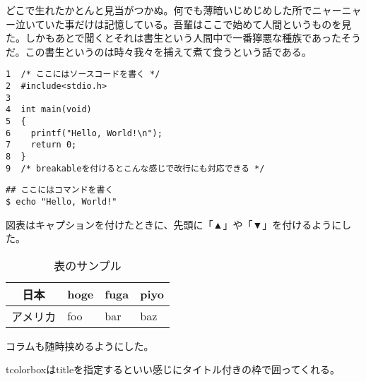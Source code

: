 \documentclass[11pt,dvipdfmx,b5paper,oneside]{jsbook}
\begin{document}
どこで生れたかとんと見当がつかぬ。何でも薄暗いじめじめした所でニャーニャー泣いていた事だけは記憶している。吾輩はここで始めて人間というものを見た。しかもあとで聞くとそれは書生という人間中で一番獰悪な種族であったそうだ。この書生というのは時々我々を捕えて煮て食うという話である。

\begin{tcolorbox}[breakable]
\begin{verbatim}
1  /* ここにはソースコードを書く */
2  #include<stdio.h>
3
4  int main(void)
5  {
6    printf("Hello, World!\n");
7    return 0;
8  }
9  /* breakableを付けるとこんな感じで改行にも対応できる */
\end{verbatim}
\end{tcolorbox}

\begin{shaded}
\begin{verbatim}
## ここにはコマンドを書く
$ echo "Hello, World!"
\end{verbatim}
\end{shaded}

図表はキャプションを付けたときに、先頭に「▲」や「▼」を付けるようにした。

\begin{table}[H]
  \centering
  \caption{表のサンプル}
  \begin{tabular}{|c|l|l|l|} \hline
    日本 & hoge & fuga & piyo \\ \hline
    アメリカ & foo & bar & baz \\ \hline
  \end{tabular}
  \label{table-sample}
\end{table}

\begin{tcolorbox}[title=これはコラム]
  コラムも随時挟めるようにした。

  tcolorboxはtitleを指定するといい感じにタイトル付きの枠で囲ってくれる。
\end{tcolorbox}
\end{document}
